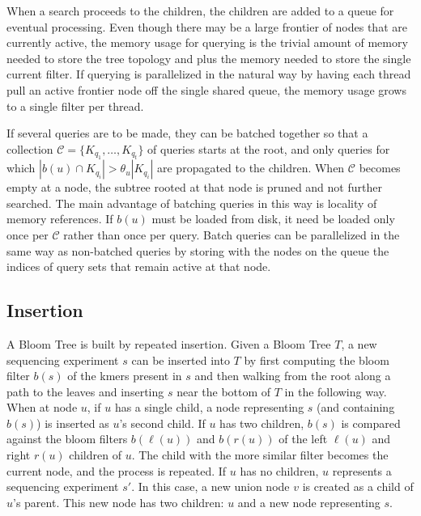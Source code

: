 \documentclass[11pt]{article}
\begin{document}
When a search proceeds to the children, the children are added to a queue for eventual processing.  Even though there may be a large frontier of nodes that are currently active, the memory usage for querying is the trivial amount of memory needed to store the tree topology and plus the memory needed to store the single current filter. If querying is parallelized in the natural way by having each thread pull an active frontier node off the single shared queue, the memory usage grows to a single filter per thread.

If several queries are to be made, they can be batched together so that a collection $\mathcal{C} = \{K_{q_1},\dots,K_{q_t}\}$ of queries starts at the root, and only queries for which $|b(u) \cap K_{q_i}| > \theta_u |K_{q_i}|$ are propagated to the children. When $\mathcal{C}$ becomes empty at a node, the subtree rooted at that node is pruned and not further searched.
The main advantage of batching queries in this way is locality of memory references. If $b(u)$ must be loaded from disk, it need be loaded only once per $\mathcal{C}$ rather than once per query. Batch queries can be parallelized in the same way as non-batched queries by storing with the nodes on the queue the indices of query sets that remain active at that node.

\subsection{Insertion}


A Bloom Tree is built by repeated insertion. Given a Bloom Tree $T$, a new sequencing experiment $s$ can be inserted into $T$ by first computing the bloom filter $b(s)$ of the kmers present in $s$ and then walking from the root along a path to the leaves and inserting $s$ near the bottom of $T$ in the following way. When at node $u$, if $u$ has a single child, a node representing $s$ (and containing $b(s)$) is inserted as $u$'s second child. If  $u$ has two children, $b(s)$ is compared against the bloom filters $b(\ell(u))$ and $b(r(u))$ of the left $\ell(u)$ and right $r(u)$ children of $u$. The child with the more similar filter becomes the current node, and the process is repeated.  If $u$ has no children, $u$ represents a sequencing experiment $s'$. In this case, a new union node $v$ is created as a child of $u$'s parent. This new node has two children: $u$ and a new node representing $s$. 
\end{document}
